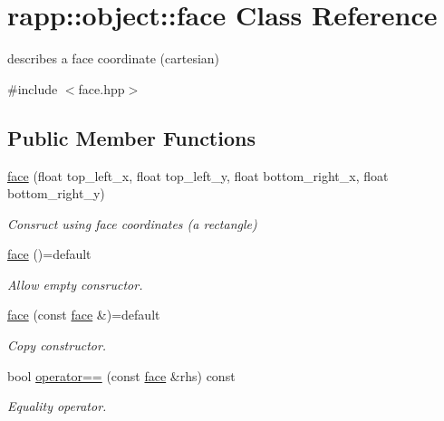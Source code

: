 \hypertarget{classrapp_1_1object_1_1face}{\section{rapp\-:\-:object\-:\-:face Class Reference}
\label{classrapp_1_1object_1_1face}
}


describes a face coordinate (cartesian)  




{\ttfamily \#include $<$face.\-hpp$>$}

\subsection*{Public Member Functions}
\begin{DoxyCompactItemize}
\item 
\hyperlink{classrapp_1_1object_1_1face_a74d841efaf8138240a4f3cc5117cec8f}{face} (float top\-\_\-left\-\_\-x, float top\-\_\-left\-\_\-y, float bottom\-\_\-right\-\_\-x, float bottom\-\_\-right\-\_\-y)
\begin{DoxyCompactList}\small\item\em Consruct using face coordinates (a rectangle) \end{DoxyCompactList}\item 
\hyperlink{classrapp_1_1object_1_1face_a94a6ba1f4f7e3e8b1398d5dbdd76acc9}{face} ()=default
\begin{DoxyCompactList}\small\item\em Allow empty consructor. \end{DoxyCompactList}\item 
\hyperlink{classrapp_1_1object_1_1face_a10fb28c9941145226e99111e73ed21ac}{face} (const \hyperlink{classrapp_1_1object_1_1face}{face} \&)=default
\begin{DoxyCompactList}\small\item\em Copy constructor. \end{DoxyCompactList}\item 
bool \hyperlink{classrapp_1_1object_1_1face_a8f1e247f980687e40969c159e7308ecd}{operator==} (const \hyperlink{classrapp_1_1object_1_1face}{face} \&rhs) const 
\begin{DoxyCompactList}\small\item\em Equality operator. \end{DoxyCompactList}\end{DoxyCompactItemize}

